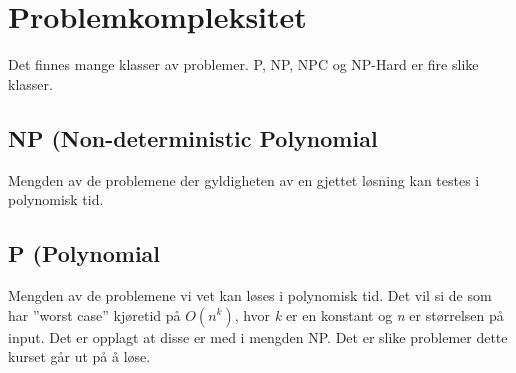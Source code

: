 \section{Problemkompleksitet}
Det finnes mange klasser av problemer. P, NP, NPC og NP-Hard er fire slike klasser.

\subsection{NP (Non-deterministic Polynomial}
Mengden av de problemene der gyldigheten av en gjettet løsning kan testes i polynomisk tid.

\subsection{P (Polynomial}
Mengden av de problemene vi vet kan løses i polynomisk tid. Det vil si de som har ''worst case'' kjøretid på $O(n^k)$, hvor \textit{k} er en konstant og \textit{n} er størrelsen på input. Det er opplagt at disse er med i mengden NP. Det er slike problemer dette kurset går ut på å løse. 


